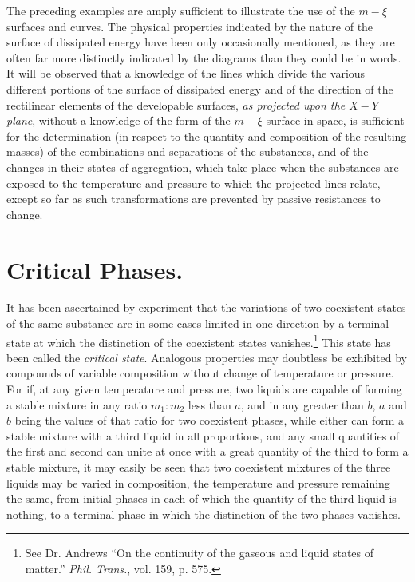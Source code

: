\documentclass[12pt]{memoir}
\begin{document}
The preceding examples are amply sufficient to illustrate the use of the $m\!-\xi$ surfaces and curves. The physical properties indicated by the nature of the surface of dissipated energy have been only occasionally mentioned, as they are often far more distinctly indicated by the diagrams than they could be in words. It will be observed that a knowledge of the lines which divide the various different portions of the surface of dissipated energy and of the direction of the rectilinear elements of the developable surfaces, \textit{as projected upon the $X\!-Y$ plane}, without a knowledge of the form of the $m\!-\xi$ surface in space, is sufficient for the determination (in respect to the quantity and composition of the resulting masses) of the combinations and separations of the substances, and of the changes in their states of aggregation, which take place when the substances are exposed to the temperature and pressure to which the projected lines relate, except so far as such transformations are prevented by passive resistances to change.

\section{Critical Phases.}
It has been ascertained by experiment that the variations of two coexistent states of the same substance are in some cases limited in one direction by a terminal state at which the distinction of the coexistent states vanishes.\footnote{See Dr. Andrews ``On the continuity of the gaseous and liquid states of matter.'' \textit{Phil. Trans.}, vol. 159, p. 575.} This state has been called the \textit{critical state}. Analogous properties may doubtless be exhibited by compounds of variable composition without change of temperature or pressure. For if, at any given temperature and pressure, two liquids are capable of forming a stable mixture in any ratio $m_1 : m_2$ less than $a$, and in any greater than $b$, $a$ and $b$ being the values of that ratio for two coexistent phases, while either can form a stable mixture with a third liquid in all proportions, and any small quantities of the first and second can unite at once with a great quantity of the third to form a stable mixture, it may easily be seen that two coexistent mixtures of the three liquids may be varied in composition, the temperature and pressure remaining the same, from initial phases in each of which the quantity of the third liquid is nothing, to a terminal phase in which the distinction of the two phases vanishes.\
\end{document}
